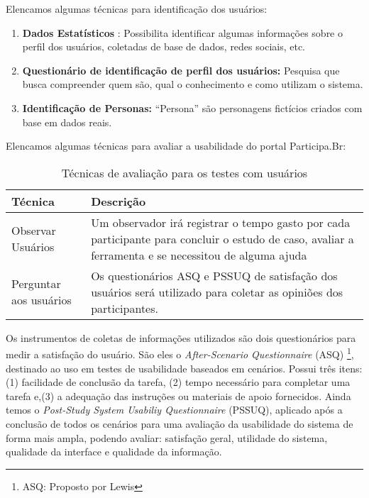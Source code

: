 Elencamos algumas técnicas para identificação dos usuários:

\begin{enumerate}
\item \textbf{Dados Estatísticos} : Possibilita identificar algumas informações sobre o perfil dos usuários, coletadas de base de dados, redes sociais, etc.

\item \textbf{Questionário de identificação de perfil dos usuários:} Pesquisa que busca compreender quem são, qual o conhecimento e como utilizam o sistema. 

\item \textbf{Identificação de Personas:} “Persona” são personagens fictícios criados com base em dados reais.  
\end{enumerate}

Elencamos algumas técnicas para avaliar a usabilidade do portal Participa.Br:

\begin{table}[h]
\begin{tabular}{|l| p{5cm} |}
\hline
Técnica & Descrição \\ \hline
Observar Usuários & Um observador irá registrar o tempo 
gasto por cada participante para concluir o estudo de caso, 
avaliar a ferramenta e se necessitou de alguma ajuda    \\ \hline
Perguntar aos usuários & Os questionários ASQ e PSSUQ 
de satisfação dos usuários será utilizado 
para coletar as opiniões dos participantes.\\ \hline
\end{tabular}
\caption{Técnicas de avaliação para os testes com usuários}
\label{tabela-tecnicas}
\end{table}

Os instrumentos de coletas de informações utilizados são dois questionários para medir a satisfação do usuário.
%
São eles o \textit{After-Scenario Questionnaire} (ASQ) \footnote{ASQ: Proposto por Lewis}, destinado ao uso em testes de usabilidade baseados em cenários. Possui três itens: (1) facilidade de conclusão da tarefa, (2) tempo necessário para completar uma tarefa e,(3) a adequação das instruções ou materiais de apoio fornecidos. Ainda temos o \textit{Post-Study System Usabiliy Questionnaire} (PSSUQ), aplicado após a conclusão de todos os cenários para uma avaliação  da usabilidade do sistema de forma mais ampla, podendo avaliar: satisfação geral, utilidade do sistema, qualidade da interface e qualidade da informação. 

